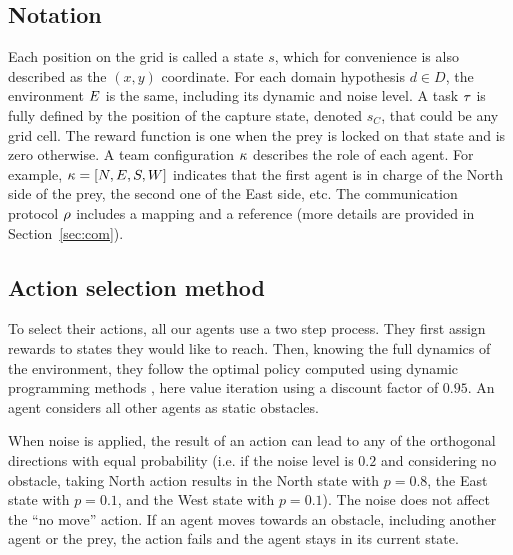 \subsection{Notation}

Each position on the grid is called a state $s$, which for convenience is also described as the $(x,y)$ coordinate. For each domain hypothesis $d \in D$, the environment $E$ is the same, including its dynamic and noise level. A task $\tau$ is fully defined by the position of the capture state, denoted $s_C$, that could be any grid cell. The reward function is one when the prey is locked on that state and is zero otherwise. A team configuration $\kappa$ describes the role of each agent. For example, $\kappa = [N,E,S,W]$ indicates that the first agent is in charge of the North side of the prey, the second one of the East side, etc. The communication protocol $\rho$ includes a mapping and a reference (more details are provided in Section~\ref{sec:com}).

\subsection{Action selection method}

To select their actions, all our agents use a two step process. They first assign rewards to states they would like to reach. Then, knowing the full dynamics of the environment, they follow the optimal policy computed using dynamic programming methods \cite{sutton1998reinforcement}, here value iteration using a discount factor of $0.95$. An agent considers all other agents as static obstacles. %

When noise is applied, the result of an action can lead to any of the orthogonal directions with equal probability (i.e. if the noise level is $0.2$ and considering no obstacle, taking North action results in the North state with $p=0.8$, the East state with $p=0.1$, and the West state with $p=0.1$). The noise does not affect the ``no move'' action. If an agent moves towards an obstacle, including another agent or the prey, the action fails and the agent stays in its current state.


